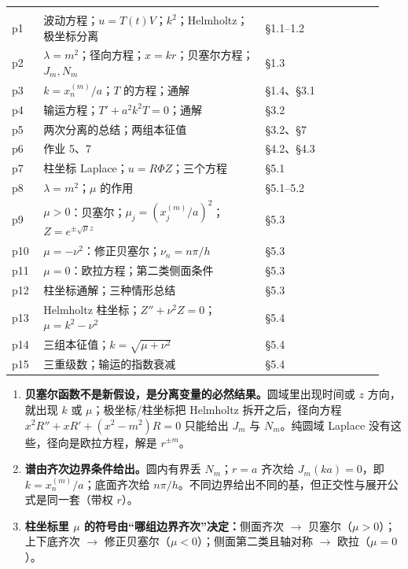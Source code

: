 \documentclass[11pt]{ctexart}
\newcommand{\tabmidrule}{\noalign{\vspace{1pt}{\color{petal}\hrule height 0.5pt}\vspace{1pt}}}
\renewcommand{\thead}[1]{\leavevmode{\bfseries\color{violetdeep}#1}}
\let\orighdr\hdr
\renewcommand{\hdr}[2]{\par\needspace{6\baselineskip}\orighdr{#1}{#2}}
\begin{document}
\begin{center}
\tabtop
\begin{tabular}{@{}L{0.08\linewidth}L{0.56\linewidth}L{0.30\linewidth}@{}}
\thead{课件页} & \thead{内容} & \thead{本讲位置} \\
\tabmidrule
p1 & 波动方程；$u=T(t)V$；$k^2$；Helmholtz；极坐标分离 & \S1.1--1.2 \\
p2 & $\lambda=m^2$；径向方程；$x=kr$；贝塞尔方程；$J_m,N_m$ & \S1.3 \\
p3 & $k=x_n^{(m)}/a$；$T$ 的方程；通解 & \S1.4、\S3.1 \\
p4 & 输运方程；$T'+a^2k^2T=0$；通解 & \S3.2 \\
p5 & 两次分离的总结；两组本征值 & \S3.2、\S7 \\
p6 & 作业 5、7 & \S4.2、\S4.3 \\
p7 & 柱坐标 Laplace；$u=R\Phi Z$；三个方程 & \S5.1 \\
p8 & $\lambda=m^2$；$\mu$ 的作用 & \S5.1--5.2 \\
p9 & $\mu>0$：贝塞尔；$\mu_j=(x_j^{(m)}/a)^2$；$Z=e^{\pm\sqrt\mu z}$ & \S5.3 \\
p10 & $\mu=-\nu^2$：修正贝塞尔；$\nu_n=n\pi/h$ & \S5.3 \\
p11 & $\mu=0$：欧拉方程；第二类侧面条件 & \S5.3 \\
p12 & 柱坐标通解；三种情形总结 & \S5.3 \\
p13 & Helmholtz 柱坐标；$Z''+\nu^2Z=0$；$\mu=k^2-\nu^2$ & \S5.4 \\
p14 & 三组本征值；$k=\sqrt{\mu+\nu^2}$ & \S5.4 \\
p15 & 三重级数；输运的指数衰减 & \S5.4 \\
\end{tabular}
\tabbot
\end{center}

\label{sec:s9}

\begin{enumerate}[label=(\arabic*)]
  \item \textbf{贝塞尔函数不是新假设，是分离变量的必然结果。}圆域里出现时间或 $z$ 方向，就出现 $k$ 或 $\mu$；极坐标/柱坐标把 Helmholtz 拆开之后，径向方程 $x^2R''+xR'+(x^2-m^2)R=0$ 只能给出 $J_m$ 与 $N_m$。纯圆域 Laplace 没有这些，径向是欧拉方程，解是 $r^{\pm m}$。
  \item \textbf{谱由齐次边界条件给出。}圆内有界丢 $N_m$；$r=a$ 齐次给 $J_m(ka)=0$，即 $k=x_n^{(m)}/a$；底面齐次给 $n\pi/h$。不同边界给出不同的基，但正交性与展开公式是同一套（带权 $r$）。
  \item \textbf{柱坐标里 $\mu$ 的符号由“哪组边界齐次”决定：}侧面齐次 $\to$ 贝塞尔（$\mu>0$）；上下底齐次 $\to$ 修正贝塞尔（$\mu<0$）；侧面第二类且轴对称 $\to$ 欧拉（$\mu=0$）。
\end{enumerate}
\end{document}
